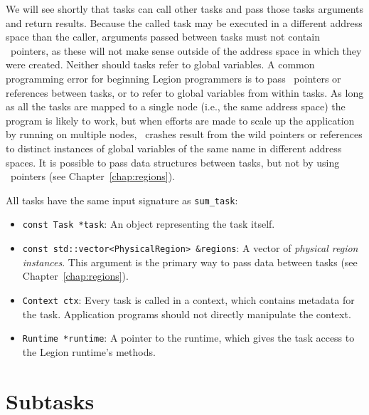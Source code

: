 We will see shortly that tasks can call other tasks and pass
those tasks arguments and return results.  Because the called task may
be executed in a different address space than the caller, arguments
passed between tasks must not contain \Cpp\ pointers, as these will
not make sense outside of the address space in which they were
created.  Neither should tasks refer to global variables. A common
programming error for beginning Legion programmers is to pass
\Cpp\ pointers or references between tasks, or to refer to global
variables from within tasks.  As long as all the tasks are mapped to a
single node (i.e., the same address space) the program is likely to
work, but when efforts are made to scale up the application by running
on multiple nodes, \Cpp\ crashes result from the wild pointers or
references to distinct instances of global variables of the same name
in different address spaces.  It is possible to pass data structures
between tasks, but not by using \Cpp\ pointers (see
Chapter~\ref{chap:regions}).

All tasks have the same input signature as {\tt sum\_task}:
\begin{itemize}

\item {\tt const Task *task}: An object representing the task itself. 

\item {\tt const std::vector<PhysicalRegion> \&regions}: A vector of {\em physical region instances}.  This argument is the
primary way to pass data between tasks (see Chapter~\ref{chap:regions}).

\item {\tt Context ctx}: Every task is called in a context, which contains metadata for the task.  Application programs
should not directly manipulate the context.

\item {\tt Runtime *runtime}: A pointer to the runtime, which gives the task access to the Legion runtime's methods.

\end{itemize}

\section{Subtasks}
\label{sec:subtasks}


